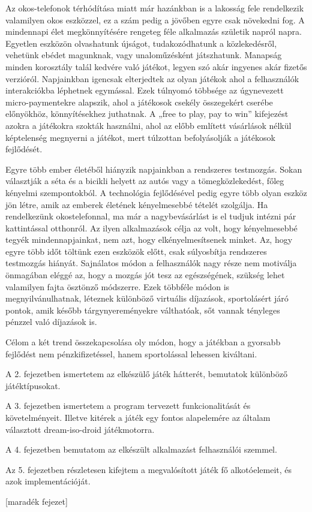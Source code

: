 Az okos-telefonok térhódítása miatt már hazánkban is a lakosság fele rendelkezik valamilyen okos eszközzel, ez a szám pedig a jövőben egyre csak növekedni fog. 
A mindennapi élet megkönnyítésére rengeteg féle alkalmazás születik napról napra. 
Egyetlen eszközön olvashatunk újságot, tudakozódhatunk a közlekedésről, vehetünk ebédet magunknak, vagy unaloműzésként játszhatunk. 
Manapság minden korosztály talál kedvére való játékot, legyen szó akár ingyenes akár fizetős verzióról. 
Napjainkban igencsak elterjedtek az olyan játékok ahol a felhasználók interakciókba léphetnek egymással. 
Ezek túlnyomó többsége az úgynevezett micro-paymentekre alapszik, ahol a játékosok csekély összegekért cserébe előnyökhöz, könnyítésekhez juthatnak. 
A „free to play, pay to win” kifejezést azokra a játékokra szokták használni, ahol az előbb említett vásárlások nélkül képtelenség megnyerni a játékot, mert túlzottan befolyásolják a játékosok fejlődését.

Egyre több ember életéből hiányzik napjainkban a rendszeres testmozgás. 
Sokan választják a séta és a bicikli helyett az autós vagy a tömegközlekedést, főleg kényelmi szempontokból. 
A technológia fejlődésével pedig egyre több olyan eszköz jön létre, amik az emberek életének kényelmesebbé tételét szolgálja. 
Ha rendelkezünk okostelefonnal, ma már a nagybevásárlást is el tudjuk intézni pár kattintással otthonról. 
Az ilyen alkalmazások célja az volt, hogy kényelmesebbé tegyék mindennapjainkat, nem azt, hogy elkényelmesítsenek minket. 
Az, hogy egyre több időt töltünk ezen eszközök előtt, csak súlyosbítja rendszeres testmozgás hiányát. 
Sajnálatos módon a felhasználók nagy része nem motiválja önmagában eléggé az, hogy a mozgás jót tesz az egészségének, szükség lehet valamilyen fajta ösztönző módszerre. 
Ezek többféle módon is megnyilvánulhatnak, léteznek különböző virtuális díjazások, sportolásért járó pontok, amik később tárgynyereményekre válthatóak, sőt vannak tényleges pénzzel való díjazások is.

Célom a két trend összekapcsolása oly módon, hogy a játékban a gyorsabb fejlődést nem pénzkifizetéssel, hanem sportolással lehessen kiváltani. 

A 2. fejezetben ismertetem az elkészülő játék hátterét, bemutatok különböző játéktípusokat. 

A 3. fejezetben ismertetem a program tervezett funkcionalitását és követelményeit. 
Illetve kitérek a játék egy fontos alapelemére az általam választott dream-iso-droid játékmotorra. 

A 4. fejezetben bemutatom az elkészült alkalmazást felhasználói szemmel. 

Az 5. fejezetben részletesen kifejtem a megvalósított játék fő alkotóelemeit, és azok implementációját. 

[maradék fejezet]